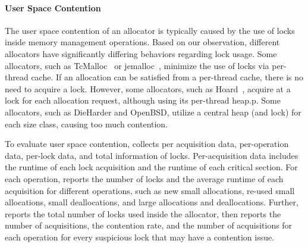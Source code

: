 \paragraph{User Space Contention} The user space contention of an allocator is typically caused by the use of locks inside memory management operations. Based on our observation, different allocators have significantly differing behaviors regarding lock usage. Some allocators, such as TcMalloc~\citep{tcmalloc} or jemalloc~\citep{jemalloc}, minimize the use of locks via per-thread cache. If an allocation can be satisfied from a per-thread cache, there is no need to acquire a lock. However, some allocators, such as Hoard~\citep{Hoard}, acquire at a lock for each allocation request, although using its per-thread heap.p. Some allocators, such as DieHarder and OpenBSD, utilize a central heap (and lock) for each size class, causing too much contention. 


To evaluate user space contention, \MP{} collects per acquisition data, per-operation data, per-lock data, and total information of locks. Per-acquisition data includes the runtime of each lock acquisition and the runtime of each critical section. For each operation, \MP{} reports the number of locks and the average runtime of each acquisition for different operations, such as new small allocations, re-used small allocations, small deallocations, and large allocations and deallocations. Further, \MP{} reports the total number of locks used inside the allocator, then reports the number of acquisitions, the contention rate, and the number of acquisitions for each operation for every suspicious lock that may have a contention issue. 
 
